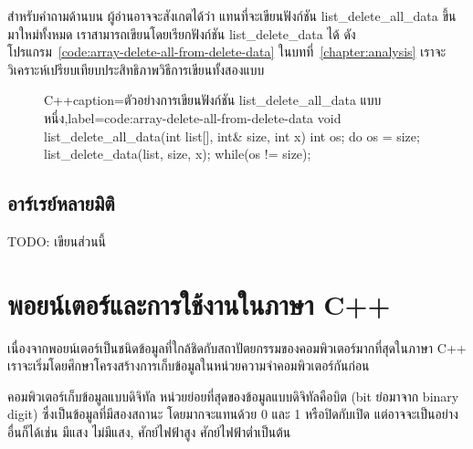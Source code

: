 สำหรับ{\wbr}คำ{\wbr}ถาม{\wbr}ด้าน{\wbr}บน ผู้{\wbr}อ่าน{\wbr}อาจ{\wbr}จะ{\wbr}สังเกต{\wbr}ได้{\wbr}ว่า แทน{\wbr}ที่{\wbr}จะ{\wbr}เขียน{\wbr}ฟังก์ชัน {\ct
  list\_delete\_all\_data} ขึ้น{\wbr}มา{\wbr}ใหม่{\wbr}ทั้งหมด เรา{\wbr}สามารถ{\wbr}เขียน{\wbr}โดย{\wbr}เรียก{\wbr}ฟังก์ชัน {\ct
  list\_delete\_data} ได้{\wbr}
ดัง{\wbr}โปรแกรม~\ref{code:array-delete-all-from-delete-data}
ใน{\wbr}บท{\wbr}ที่~\ref{chapter:analysis}
เรา{\wbr}จะ{\wbr}วิเคราะห์{\wbr}เปรียบเทียบ{\wbr}ประสิทธิภาพ{\wbr}วิธีการ{\wbr}เขียน{\wbr}ทั้ง{\wbr}สอง{\wbr}แบบ{\wbr}

\begin{figure}
\latintext
\begin{codelist}{C++}{caption={\thaitext ตัวอย่าง{\wbr}การ{\wbr}เขียน{\wbr}ฟังก์ชัน {\ct list\_delete\_all\_data} แบบ{\wbr}หนึ่ง\latintext},label=code:array-delete-all-from-delete-data}
void list_delete_all_data(int list[], int& size, int x)
{
  int os;
  do {
    os = size;
    list_delete_data(list, size, x);
  } while(os != size);
}
\end{codelist}
\thaitext
\end{figure}

\subsection{อาร์{\wbr}เรย์{\wbr}หลาย{\wbr}มิติ}

TODO: เขียน{\wbr}ส่วน{\wbr}นี้{\wbr}

\section{พอยน์เตอร์และ{\wbr}การ{\wbr}ใช้งาน{\wbr}ใน{\wbr}ภาษา C++}
\label{sect:array-pointer-c}

เนื่อง{\wbr}จาก{\wbr}พอยน์เตอร์{\wbr}เป็น{\wbr}ชนิด{\wbr}ข้อมูล{\wbr}ที่{\wbr}ใกล้{\wbr}ชิด{\wbr}กับ{\wbr}สถาปัตยกรรม{\wbr}ของ{\wbr}คอมพิวเตอร์{\wbr}มาก{\wbr}ที่สุด{\wbr}ใน{\wbr}ภาษา{\wbr}
C++ เรา{\wbr}จะ{\wbr}เริ่ม{\wbr}โดย{\wbr}ศึกษา{\wbr}โครงสร้าง{\wbr}การ{\wbr}เก็บ{\wbr}ข้อมูล{\wbr}ใน{\wbr}หน่วย{\wbr}ความ{\wbr}จำ{\wbr}คอมพิวเตอร์{\wbr}กัน{\wbr}ก่อน{\wbr}

คอมพิวเตอร์{\wbr}เก็บ{\wbr}ข้อมูล{\wbr}แบบ{\wbr}ดิจิทัล หน่วย{\wbr}ย่อย{\wbr}ที่สุด{\wbr}ของ{\wbr}ข้อมูล{\wbr}แบบ{\wbr}ดิจิทัล{\wbr}คือ{\wbr}บิต (bit ย่อ{\wbr}มา{\wbr}จาก{\wbr}
binary digit) ซึ่ง{\wbr}เป็น{\wbr}ข้อมูล{\wbr}ที่{\wbr}มี{\wbr}สอง{\wbr}สถานะ โดย{\wbr}มาก{\wbr}จะ{\wbr}แทน{\wbr}ด้วย 0 และ 1 หรือ{\wbr}ปิด{\wbr}กับ{\wbr}เปิด{\wbr}
แต่{\wbr}อาจ{\wbr}จะ{\wbr}เป็น{\wbr}อย่าง{\wbr}อื่น{\wbr}ก็{\wbr}ได้{\wbr}เช่น มี{\wbr}แสง ไม่{\wbr}มี{\wbr}แสง, ศักย์{\wbr}ไฟฟ้า{\wbr}สูง ศักย์{\wbr}ไฟฟ้า{\wbr}ต่ำ{\wbr}เป็นต้น{\wbr}

